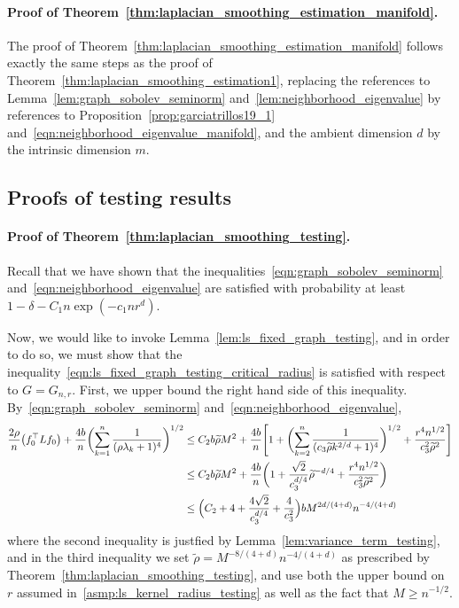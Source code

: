 \documentclass[twoside]{article}
\newcommand{\1}{\mathbf{1}}
\newcommand{\Lap}{L}
\newcommand{\wt}[1]{\widetilde{#1}}
\theoremstyle{definition}
\theoremstyle{remark}
\begin{document}
\paragraph{Proof of Theorem~\ref{thm:laplacian_smoothing_estimation_manifold}.}
The proof of Theorem~\ref{thm:laplacian_smoothing_estimation_manifold} follows exactly the same steps as the proof of Theorem~\ref{thm:laplacian_smoothing_estimation1}, replacing the references to Lemma~\ref{lem:graph_sobolev_seminorm} and~\ref{lem:neighborhood_eigenvalue} by references to Proposition~\ref{prop:garciatrillos19_1} and~\eqref{eqn:neighborhood_eigenvalue_manifold}, and the ambient dimension $d$ by the intrinsic dimension $m$. 

\subsection{Proofs of testing results}
\label{subsec:laplacian_smoothing_testing_pf}

\paragraph{Proof of Theorem~\ref{thm:laplacian_smoothing_testing}.}
Recall that we have shown that the inequalities~\eqref{eqn:graph_sobolev_seminorm} and~\eqref{eqn:neighborhood_eigenvalue} are satisfied with probability at least $1 - \delta - C_1n\exp(-c_1nr^d)$.

Now, we would like to invoke Lemma~\ref{lem:ls_fixed_graph_testing}, and in order to do so, we must show that the inequality~\eqref{eqn:ls_fixed_graph_testing_critical_radius} is satisfied with respect to $G = G_{n,r}$. First, we upper bound the right hand side of this inequality. By~\eqref{eqn:graph_sobolev_seminorm} and~\eqref{eqn:neighborhood_eigenvalue},
\begin{align*}
\frac{2 \rho}{n} \bigl(f_0^{\top} \Lap f_0\bigr) + \frac{4b}{n} \biggl(\sum_{k = 1}^{n} \frac{1}{(\rho\lambda_k + 1)^4} \biggr)^{1/2} & \leq C_2b\wt{\rho}M^2 + \frac{4b}{n}\Biggl[1 + \biggl(\sum_{k = 2}^{n} \frac{1}{(c_3\wt{\rho}k^{2/d} + 1)^4} \biggr)^{1/2} + \frac{r^4n^{1/2}}{c_3^2\wt{\rho}^2}\Biggr] \\
& \leq C_2b\wt{\rho}M^2 + \frac{4b}{n}\biggl(1 + \frac{\sqrt{2}}{c_3^{d/4}}\wt{\rho}^{-d/4} + \frac{r^4n^{1/2}}{c_3^2\wt{\rho}^2}\biggr) \\ 
& \leq \Bigl(C_2 + 4 + \frac{4\sqrt{2}}{c_3^{d/4}} + \frac{4}{c_3^2}\Bigr)bM^{2d/(4 + d)} n^{-4/(4 + d)}
\end{align*}
where the second inequality is justfied by Lemma~\ref{lem:variance_term_testing}, and in the third inequality we set $\wt{\rho} = M^{-8/(4 + d)}n^{-4/(4 + d)}$ as prescribed by Theorem~\ref{thm:laplacian_smoothing_testing}, and use both the upper bound on $r$ assumed in~\ref{asmp:ls_kernel_radius_testing} as well as the fact that $M \geq n^{-1/2}$.
\end{document}
